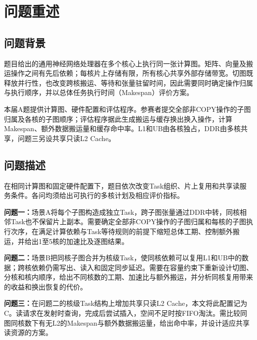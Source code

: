 \section{问题重述}
\subsection{问题背景}
题目给出的通用神经网络处理器在多个核心上执行同一张计算图。矩阵、向量及搬运操作之间有先后依赖；每核片上存储有限，所有核心共享外部存储带宽。切图既释放并行性，也改变跨核搬运、等待和张量驻留时间，因此需要同时确定操作归属与执行顺序，并以总体任务执行时间（Makespan）评价方案。

本届A题提供计算图、硬件配置和评估程序。参赛者提交全部非COPY操作的子图归属及各核的子图顺序；评估程序据此生成搬运与缓存换出换入操作，计算Makespan、额外数据搬运量和缓存命中率。L1和UB由各核独占，DDR由多核共享，问题三另设共享只读L2 Cache。

\subsection{问题描述}
在相同计算图和固定硬件配置下，题目依次改变Task组织、片上复用和共享读服务条件。各问均须给出可执行的多核计划及相应评价指标。

\textbf{问题一：}场景A将每个子图构造成独立Task，跨子图张量通过DDR中转，同核相邻Task也不保留片上副本。需要确定全部非COPY操作的子图归属和每核的子图执行次序，在满足计算依赖与Task等待规则的前提下缩短总体工期、控制额外搬运，并给出1至5核的加速比及逐图结果。

\textbf{问题二：}场景B把同核子图合并为核级Task，使同核依赖可以复用L1和UB中的数据；跨核依赖仍需写出、读入和固定同步延迟。需要在容量约束下重新设计切图、分核和核内顺序，给出不同核数的工期、加速比与额外搬运，并分析同核复用带来的收益和换出恢复的代价。

\textbf{问题三：}在问题二的核级Task结构上增加共享只读L2 Cache，本文将此配置记为C。读请求在发射时查询，完成后尝试插入，空间不足时按FIFO淘汰。需比较同图同核数下有无L2的Makespan与额外数据搬运量，给出命中率，并设计适应共享读资源的方案。
